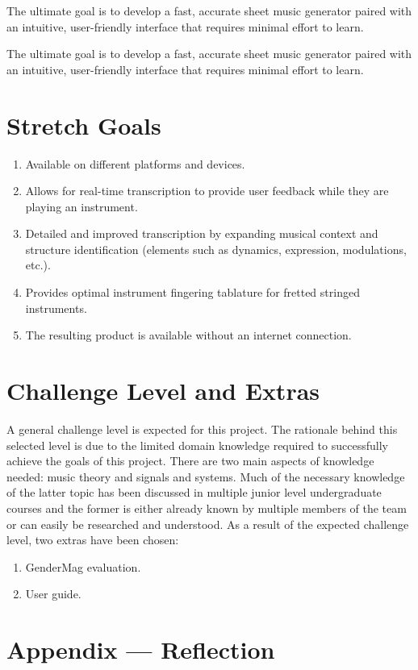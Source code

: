 \documentclass{article}
\begin{document}
The ultimate goal is to develop a fast, accurate sheet music generator paired with an intuitive, user-friendly interface that requires minimal effort to learn.

The ultimate goal is to develop a fast, accurate sheet music generator paired with an intuitive, user-friendly interface that requires minimal effort to learn.

\section{Stretch Goals}
\begin{enumerate}
    \item Available on different platforms and devices.
    \item Allows for real-time transcription to provide user feedback while they are playing an
    instrument.
    \item Detailed and improved transcription by expanding musical context and
    structure identification (elements such as dynamics, expression, modulations, etc.).
    \item Provides optimal instrument fingering tablature for fretted stringed instruments.
    \item The resulting product is available without an internet connection.
\end{enumerate}

\section{Challenge Level and Extras}
A general challenge level is expected for this project. The rationale behind this selected level is due to
the limited domain knowledge required to successfully achieve the goals of this project. There are two main 
aspects of knowledge needed: music theory and signals and systems. Much of the necessary knowledge of the 
latter topic has been discussed in multiple junior level undergraduate courses and the former is either already
known by multiple members of the team or can easily be researched and understood.
As a result of the expected challenge level, two extras have been chosen:
\begin{enumerate}
    \item GenderMag evaluation.
    \item User guide.
\end{enumerate}

\newpage{}

\section*{Appendix --- Reflection}
\end{document}
